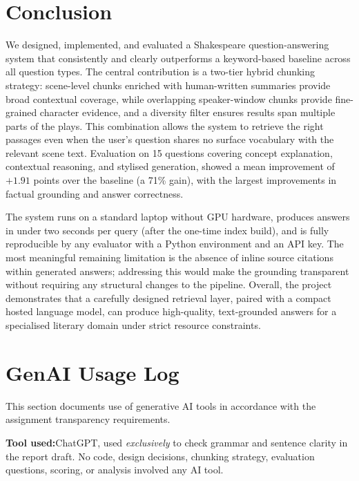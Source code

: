 \documentclass[10pt,conference]{IEEEtran}
\begin{document}
\section{Conclusion}
\label{sec:conclusion}

We designed, implemented, and evaluated a Shakespeare
question-answering system that consistently and clearly outperforms a
keyword-based baseline across all question types. The central
contribution is a two-tier hybrid chunking strategy: scene-level
chunks enriched with human-written summaries provide broad contextual
coverage, while overlapping speaker-window chunks provide fine-grained
character evidence, and a diversity filter ensures results span
multiple parts of the plays. This combination allows the system to
retrieve the right passages even when the user's question shares no
surface vocabulary with the relevant scene text. Evaluation on 15
questions covering concept explanation, contextual reasoning, and
stylised generation, showed a mean improvement of $+1.91$ points
over the baseline (a 71\% gain), with the largest improvements in
factual grounding and answer correctness.

The system runs on a standard laptop without GPU hardware, produces
answers in under two seconds per query (after the one-time index
build), and is fully reproducible by any evaluator with a Python
environment and an API key. The most meaningful remaining limitation
is the absence of inline source citations within generated answers;
addressing this would make the grounding transparent without requiring
any structural changes to the pipeline. Overall, the project
demonstrates that a carefully designed retrieval layer, paired with a
compact hosted language model, can produce high-quality,
text-grounded answers for a specialised literary domain under strict
resource constraints.

\section*{GenAI Usage Log}

\vspace{4pt}
\noindent This section documents use of generative AI tools in
accordance with the assignment transparency requirements.

\vspace{5pt}
\begin{mdframed}[style=callout]
\small\noindent\textbf{Tool used:}\enspace ChatGPT, used
\textit{exclusively} to check grammar and sentence clarity in the
report draft. No code, design decisions, chunking strategy, evaluation
questions, scoring, or analysis involved any AI tool.
\end{mdframed}
\end{document}
